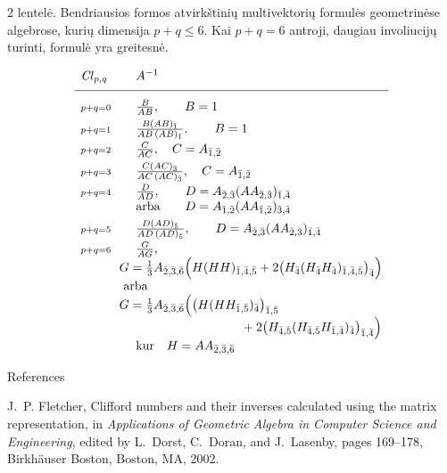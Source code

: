 \documentclass[a4paper,10pt,lithuanian]{article}
\newcommand{\cl}[2]{\ensuremath{\mathit{Cl}_{#1,#2}}} %
\begin{document}
\begin{multicols*}{2}
\vspace{10pt}  lentelė.
Bendriausios formos atvirkštinių multivektorių formulės geometrinėse algebrose, kurių dimensija $p+q\le 6$. Kai $p+q=6$ antroji, daugiau involiucijų turinti, formulė yra greitesnė.
\begin{center}
\[\begin{array}{ll}
\cl{p}{q}&\quad  A^{-1} \\[5pt]\hline\\[-5pt]
\scriptstyle p+q=0&\quad\frac{B}{AB},\qquad B=1\\[4pt]
%
\scriptstyle p+q=1&\quad
\frac{B(AB)_{\bar{1}}}{AB\,(AB)_{\bar{1}}},\qquad B=1\\[4pt]
%
\scriptstyle  p+q=2&\quad \frac{C}{AC}
,\quad C=A_{\bar{1},\bar{2}}\\[4pt]
%
\scriptstyle p+q=3 &\quad
 \frac{C(AC)_{\bar{3}}}{AC\,(AC)_{\bar{3}}}
,\quad C=A_{\bar{1},\bar{2}}\\[4pt]
%
\scriptstyle p+q=4&\quad\frac{D}{AD},\qquad
D=A_{\bar{2},\bar{3}}
(AA_{\bar{2},\bar{3}})_{\bar{1},\bar{4}}\quad \\
   &\quad\textrm{arba}\qquad D=A_{\bar{1},\bar{2}}(A
A_{\bar{1},\bar{2}})_{\bar{3},\bar{4}}  \\[4pt]
%
\scriptstyle p+q=5&\quad\frac{D(AD)_{\bar{5}}}{AD\,
(AD)_{\bar{5}}},\qquad
D=A_{\bar{2},\bar{3}}
(AA_{\bar{2},\bar{3}})_{\bar{1},\bar{4}}\\[4pt]
%
\scriptstyle p+q=6&\quad\frac{G}{AG},\\
&
\!\!G=\frac{1}{3} A_{\bar{2},\bar{3},\bar{6}} \Bigl(H (H H)_{\bar{1},\bar{4},\bar{5}} + 2 \bigl(H_{\bar{4}} (H_{\bar{4}} H_{\bar{4}})_{\bar{1},\bar{4},\bar{5}}\bigr)_{\bar{4}}\Bigr)\\
&\textrm{arba}\\
&\!\!G=\frac{1}{3} A_{\bar{2},\bar{3},\bar{6}} \Bigl(\bigl(H (H H_{\bar{1},\bar{5}})_{\bar{4}}\bigr)_{\bar{1},\bar{5}}\\
&\hphantom{G=\frac{1}{3} A_{\bar{2},\bar{3},\bar{6}} \Bigl(\bigl(H (H H}
+ 2 \bigl(H_{\bar{4},\bar{5}} (H_{\bar{4},\bar{5}} H_{\bar{1},\bar{4}})_{\bar{4}}\bigr)_{\bar{1},\bar{4}}\Bigr)\\
&\quad\textrm{kur}\quad H=A A_{\bar{2},\bar{3},\bar{6}}
\end{array}
\]
\end{center}


\begin{thebibliography}{References}

J.~P. Fletcher,
\newblock Clifford numbers and their inverses calculated using the matrix
  representation,
\newblock in {\em Applications of Geometric Algebra in Computer Science and
  Engineering}, edited by L.~Dorst, C.~Doran, and J.~Lasenby, pages 169--178,
  Birkh{\"a}user Boston, Boston, MA, 2002.


\end{thebibliography}
\end{multicols*}
\end{document}
